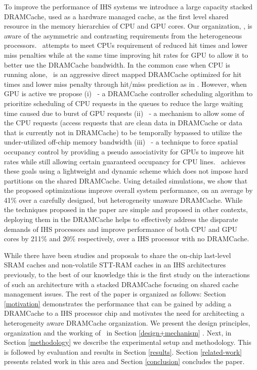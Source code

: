 To improve the performance of IHS systems we introduce a large capacity stacked DRAMCache, used as a hardware managed cache, as the first level shared resource in the memory hierarchies of CPU and GPU cores. Our organization, \cachename, is aware of the asymmetric and contrasting requirements from the heterogeneous processors. \cachename\ attempts to meet CPUs requirement of reduced hit times and lower miss penalties while at the same time improving hit rates for GPU to allow it to better use the DRAMCache bandwidth. In the common case when CPU is running alone, \cachename\ is an aggressive direct mapped DRAMCache optimized for hit times and lower miss penalty through hit/miss prediction as in \cite{alloy}. However, when GPU is active we propose (i) \prioname\ - a DRAMCache controller scheduling algorithm to prioritize scheduling of CPU requests in the queues to reduce the large waiting time caused due to burst of GPU requests (ii) \bypassname\ - a mechanism to allow some of the CPU requests (access requests that are clean data in DRAMCache or data that is currently not in DRAMCache) to be temporally bypassed to utilize the under-utilized off-chip memory bandwidth
(iii) \chaining\ - a technique to force spatial occupancy control by providing a pseudo associativity for GPUs to improve hit rates while still allowing certain guaranteed occupancy for CPU lines. \cachename\ achieves these goals using a lightweight and dynamic scheme which does not impose hard partitions on the shared DRAMCache. Using detailed simulations, we show that the proposed optimizations improve overall system performance, on an average by 41\% over a carefully designed, but heterogeneity unaware DRAMCache.
While the techniques proposed in the paper are simple and proposed in other contexts, deploying them in the DRAMCache helps to effectively address the disparate demands of IHS processors and improve performance of both CPU and GPU cores by 211\% and 20\% respectively, over a IHS processor with no DRAMCache.

\par While there have been studies and proposals to share the on-chip last-level SRAM caches \cite{helm,tap} and non-volatile STT-RAM caches \cite{oscar} in an IHS architectures previously, to the best of our knowledge this is the first study on the interactions of such an architecture with a stacked DRAMCache focusing on shared cache management issues.
The rest of the paper is organized as follows: Section \ref{motivation} demonstrates the performance that can be gained by adding a DRAMCache to a IHS processor chip and motivates the need for architecting a heterogeneity aware DRAMCache organization. We present the design principles, organization and the working of \cachename\ in Section \ref{design+mechanism} . Next, in Section \ref{methodology} we describe the experimental setup and methodology. This is followed by evaluation and results in Section \ref{results}. Section \ref{related-work} presents related work in this area and Section \ref{conclusion} concludes the paper.
